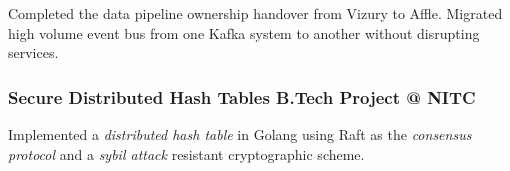 \documentclass[12pt]{scrartcl}
\newcommand{\hll}[1]{{\color{RawSienna}#1}}
\newcommand{\hlp}[1]{{\color{Maroon}#1}}
\begin{document}
Completed the data pipeline ownership handover from Vizury to Affle. Migrated high volume event bus from one \hlp{Kafka} system to another without disrupting services.





\subsubsection[sDHT]{Secure Distributed Hash Tables \hfill B.Tech Project @ NITC}

Implemented a \textit{distributed hash table} in \hll{Golang} using \hlp{Raft} as the \textit{consensus protocol} and a \textit{sybil attack} resistant cryptographic scheme.
\end{document}
